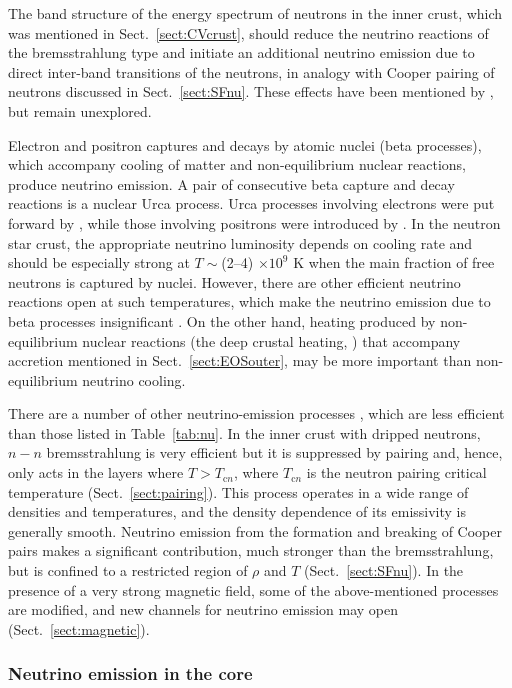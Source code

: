 \documentclass[smallextended]{svjour3}       %
\newcommand{\Tcn}{T_{\mathrm{c}n}}
\begin{document}
The band structure of the energy spectrum of neutrons in the
inner crust, which was mentioned in Sect.~\ref{sect:CVcrust},
should reduce the neutrino reactions of the bremsstrahlung
type and initiate an additional neutrino emission due to
direct inter-band transitions of the neutrons, in analogy
with Cooper pairing of neutrons discussed in
Sect.~\ref{sect:SFnu}. These effects have been mentioned by
\citet{YKGH01}, but remain unexplored.

Electron and positron captures and decays by atomic nuclei
(beta processes), which accompany cooling of matter and
non-equilibrium nuclear reactions, produce neutrino
emission. A pair of consecutive beta capture and decay
reactions is a nuclear Urca process. Urca processes
involving electrons were put forward by
\citet{GamowSchoenberg41}, while those involving positrons
were introduced by \citet{Pinaev}. In the neutron star
crust, the appropriate neutrino luminosity depends on
cooling rate and should be especially strong at $T
\sim$(2--4) $\times 10^9$ K when the main fraction of free
neutrons is captured by nuclei. However, there are other
efficient neutrino reactions open at such temperatures,
which make the neutrino emission due to beta processes
insignificant \citep{YKGH01}. On the other hand, heating
produced by non-equilibrium nuclear reactions (the deep
crustal heating, \citealp{HZ90}) that accompany accretion
mentioned in Sect.~\ref{sect:EOSouter}, may be more
important than non-equilibrium neutrino cooling.

There are a number of other neutrino-emission processes
\citep{YKGH01}, which are less efficient than those listed
in Table~\ref{tab:nu}.  In the inner crust with dripped
neutrons, $n-n$ bremsstrahlung is very efficient but it is
suppressed by pairing and, hence, only acts in the layers
where $T>\Tcn$, where $\Tcn$ is the neutron pairing critical
temperature (Sect.~\ref{sect:pairing}). This process
operates in a wide range of densities and temperatures, and
the density dependence of its emissivity is generally
smooth. Neutrino emission from the formation and breaking of
Cooper pairs makes a significant contribution, much stronger
than the bremsstrahlung, but is confined to a restricted
region of $\rho$ and $T$ (Sect.~\ref{sect:SFnu}). In the
presence of a very strong magnetic field, some of the
above-mentioned processes are modified, and new channels for
neutrino emission may open (Sect.~\ref{sect:magnetic}).

\subsubsection{Neutrino emission in the core}
\label{sect:nu-core}
\end{document}
